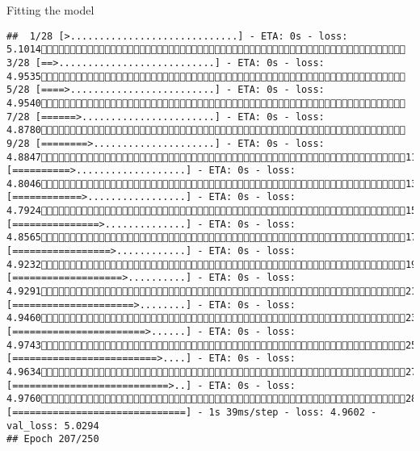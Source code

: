 \documentclass[
  ignorenonframetext,
]{beamer}
\begin{document}
\begin{frame}[fragile]{Fitting the model}
\begin{verbatim}
##  1/28 [>.............................] - ETA: 0s - loss: 5.1014 3/28 [==>...........................] - ETA: 0s - loss: 4.9535 5/28 [====>.........................] - ETA: 0s - loss: 4.9540 7/28 [======>.......................] - ETA: 0s - loss: 4.8780 9/28 [========>.....................] - ETA: 0s - loss: 4.884711/28 [==========>...................] - ETA: 0s - loss: 4.804613/28 [============>.................] - ETA: 0s - loss: 4.792415/28 [===============>..............] - ETA: 0s - loss: 4.856517/28 [=================>............] - ETA: 0s - loss: 4.923219/28 [===================>..........] - ETA: 0s - loss: 4.929121/28 [=====================>........] - ETA: 0s - loss: 4.946023/28 [=======================>......] - ETA: 0s - loss: 4.974325/28 [=========================>....] - ETA: 0s - loss: 4.963427/28 [===========================>..] - ETA: 0s - loss: 4.976028/28 [==============================] - 1s 39ms/step - loss: 4.9602 - val_loss: 5.0294
## Epoch 207/250

\end{verbatim}
\end{frame}
\end{document}
